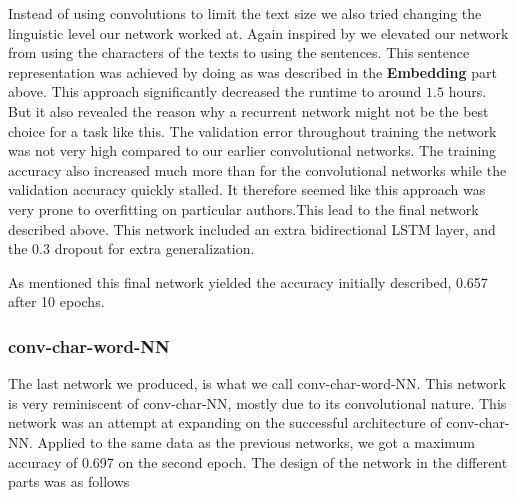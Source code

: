 Instead of using convolutions to limit the text size we also tried changing
the linguistic level our network worked at. Again inspired by \cite{qian:2018}
we elevated our network from using the characters of the texts to using the
sentences. This sentence representation was achieved by doing as was described
in the \textbf{Embedding} part above. This approach significantly decreased
the runtime to around $1.5$ hours. But it also revealed the reason why a
recurrent network might not be the best choice for a task like this. The
validation error throughout training the network was not very high compared to
our earlier convolutional networks. The training accuracy also increased much
more than for the convolutional networks while the validation accuracy quickly
stalled. It therefore seemed like this approach was very prone to overfitting on
particular authors.This lead to the final network described above. This network
included an extra bidirectional \gls{LSTM} layer, and the 0.3 dropout for extra
generalization.

As mentioned this final network yielded the accuracy initially described,
0.657 after 10 epochs. 


\subsubsection{\glsdesc{conv-char-word-NN}}
\label{subsubsec:conv_char_word_nn}

The last network we produced, is what we call \gls{conv-char-word-NN}.
This network is very reminiscent of \gls{conv-char-NN}, mostly due to
its convolutional nature. This network was an attempt at expanding
on the successful architecture of \gls{conv-char-NN}. Applied to the 
same data as the previous networks, we got a maximum accuracy of 0.697
on the second epoch. The design of the network in the different parts was
as follows

